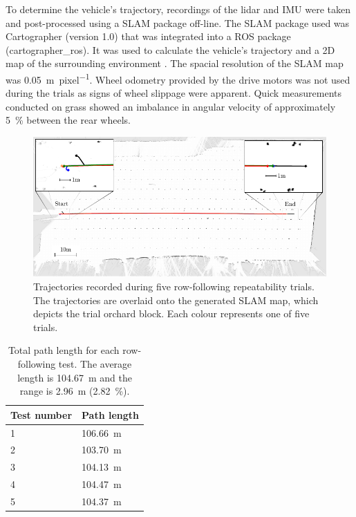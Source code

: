 \documentclass[preprint,authoryear,12pt]{elsarticle}
\begin{document}
    To determine the vehicle's trajectory, recordings of the lidar and IMU were taken and post-processed using a SLAM package off-line.
    The SLAM package used was Cartographer (version 1.0) that was integrated into a ROS package (cartographer\_ros).
    It was used to calculate the vehicle's trajectory and a 2D map of the surrounding environment \citep{Hess2016}.
    The spacial resolution of the SLAM map was \SI{0.05}{\meter\per pixel}.
    Wheel odometry provided by the drive motors was not used during the trials as signs of wheel slippage were apparent.
    Quick measurements conducted on grass showed an imbalance in angular velocity of approximately \SI{5}{\percent} between the rear wheels.

    \begin{figure}[htb]
        \centering
        \includegraphics[width=\linewidth]{imgs/slam/paths2.pdf}
        \caption{
            Trajectories recorded during five row-following repeatability trials.
            The trajectories are overlaid onto the generated SLAM map, which depicts the trial orchard block.
            Each colour represents one of five trials.
        }
        \label{fig:row_following_paths}
    \end{figure}

    \begin{table}[htbp]
      \centering
      \footnotesize
      \begin{tabular}{ l l}

          \textbf{Test number}      &\textbf{Path length} \\ \hline
          1 & \SI{106.66}{\meter}\\
          2 & \SI{103.70}{\meter}\\
          3 & \SI{104.13}{\meter}\\
          4 & \SI{104.47}{\meter}\\
          5 & \SI{104.37}{\meter}\\
      \end{tabular}
      \caption{Total path length for each row-following test. The average length is \SI{104.67}{\meter} and the range is \SI{2.96}{\meter} (\SI{2.82}{\percent}).}
      \label{table:row_follow_path_lenghts}
    \end{table}
\end{document}
